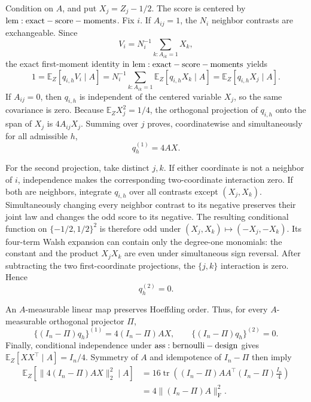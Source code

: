Condition on \(A\), and put \(X_j=Z_j-1/2\).  The score is centered by \({\rm lem:exact-score-moments}\).  Fix \(i\).  If \(A_{ij}=1\), the \(N_i\) neighbor contrasts are exchangeable.  Since
\[
 V_i=N_i^{-1}\sum_{k:A_{ik}=1}X_k,
\]
the exact first-moment identity in \({\rm lem:exact-score-moments}\) yields
\[
 1=\mathbb E_Z[q_{i,h}V_i\mid A]
 =N_i^{-1}\sum_{k:A_{ik}=1}\mathbb E_Z[q_{i,h}X_k\mid A]
 =\mathbb E_Z[q_{i,h}X_j\mid A].
\]
If \(A_{ij}=0\), then \(q_{i,h}\) is independent of the centered variable \(X_j\), so the same covariance is zero.  Because \(\mathbb E_ZX_j^2=1/4\), the orthogonal projection of \(q_{i,h}\) onto the span of \(X_j\) is \(4A_{ij}X_j\).  Summing over \(j\) proves, coordinatewise and simultaneously for all admissible \(h\),
\[
 q_h^{(1)}=4AX.
\]

For the second projection, take distinct \(j,k\).  If either coordinate is not a neighbor of \(i\), independence makes the corresponding two-coordinate interaction zero.  If both are neighbors, integrate \(q_{i,h}\) over all contrasts except \((X_j,X_k)\).  Simultaneously changing every neighbor contrast to its negative preserves their joint law and changes the odd score to its negative.  The resulting conditional function on \(\{-1/2,1/2\}^2\) is therefore odd under \((X_j,X_k)\mapsto(-X_j,-X_k)\).  Its four-term Walsh expansion can contain only the degree-one monomials: the constant and the product \(X_jX_k\) are even under simultaneous sign reversal.  After subtracting the two first-coordinate projections, the \(\{j,k\}\) interaction is zero.  Hence
\[
 q_h^{(2)}=0.
\]

An \(A\)-measurable linear map preserves Hoeffding order.  Thus, for every \(A\)-measurable orthogonal projector \(\Pi\),
\[
 \{(I_n-\Pi)q_h\}^{(1)}=4(I_n-\Pi)AX,
 \qquad \{(I_n-\Pi)q_h\}^{(2)}=0.
\]
Finally, conditional independence under \({\rm ass:bernoulli-design}\) gives \(\mathbb E_Z[XX^\top\mid A]=I_n/4\).  Symmetry of \(A\) and idempotence of \(I_n-\Pi\) then imply
\[
\begin{aligned}
 \mathbb E_Z\!\left[\|4(I_n-\Pi)AX\|_2^2\mid A\right]
 &=16\operatorname{tr}\!\left((I_n-\Pi)AA^\top(I_n-\Pi)\frac{I_n}{4}\right)\\
 &=4\|(I_n-\Pi)A\|_{\mathrm F}^2.
\end{aligned}
\]